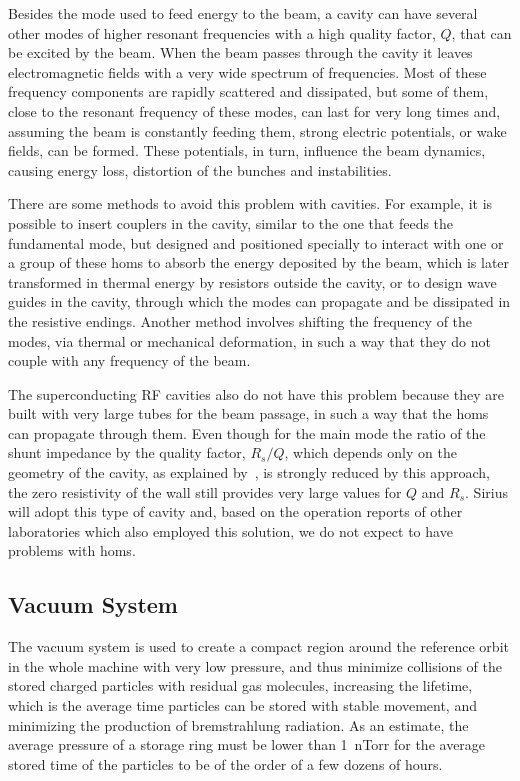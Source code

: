     Besides the mode used to feed energy to the beam, a cavity can have several other modes of higher resonant frequencies with a high quality factor, $Q$, that can be excited by the beam. When the beam passes through the cavity it leaves electromagnetic fields with a very wide spectrum of frequencies. Most of these frequency components are rapidly scattered and dissipated, but some of them, close to the resonant frequency of these modes, can last for very long times and, assuming the beam is constantly feeding them, strong electric potentials, or wake fields, can be formed. These potentials, in turn, influence the beam dynamics, causing energy loss, distortion of the bunches and instabilities.

    There are some methods to avoid this problem with cavities. For example, it is possible to insert couplers in the cavity, similar to the one that feeds the fundamental mode, but designed and positioned specially to interact with one or a group of these \glspl{hom} to absorb the energy deposited by the beam, which is later transformed in thermal energy by resistors outside the cavity, or to design wave guides in the cavity, through which the modes can propagate and be dissipated in the resistive endings. Another method involves shifting the frequency of the modes, via thermal or mechanical deformation, in such a way that they do not couple with any frequency of the beam.

    The superconducting RF cavities also do not have this problem because they are built with very large tubes for the beam passage, in such a way that the \glspl{hom} can propagate through them. Even though for the main mode the ratio of the shunt impedance by the quality factor, $R_s/Q$, which depends only on the geometry of the cavity, as explained by~, is strongly reduced by this approach, the zero resistivity of the wall still provides very large values for $Q$ and $R_s$. Sirius will adopt this type of cavity and, based on the operation reports of other laboratories which also employed this solution, we do not expect to have problems with \glspl{hom}.

\subsection{Vacuum System}

    The vacuum system is used to create a compact region around the reference orbit in the whole machine with very low pressure, and thus minimize collisions of the stored charged particles with residual gas molecules, increasing the lifetime, which is the average time particles can be stored with stable movement, and minimizing the production of bremstrahlung radiation. As an estimate, the average pressure of a storage ring must be lower than \SI{1}{\nano Torr} for the average stored time of the particles to be of the order of a few dozens of hours.

